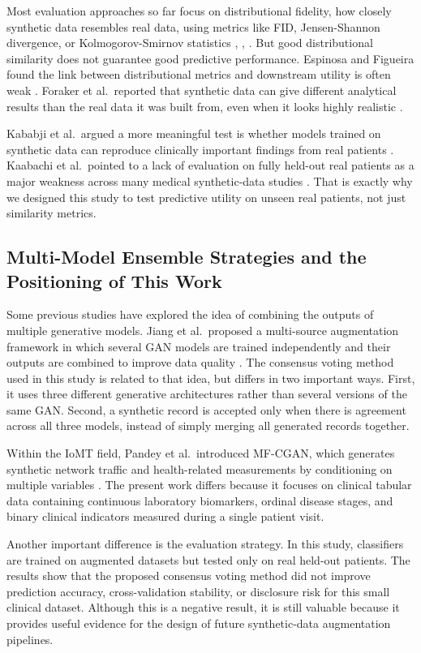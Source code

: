 \documentclass[journal]{IEEEtran}
\begin{document}
Most evaluation approaches so far focus on distributional fidelity, how closely synthetic data resembles real data, using metrics like FID, Jensen-Shannon divergence, or Kolmogorov-Smirnov statistics \cite{yan2022}, \cite{figueira2022}, \cite{dankar2022}. But good distributional similarity does not guarantee good predictive performance. Espinosa and Figueira found the link between distributional metrics and downstream utility is often weak \cite{espinosa2023}. Foraker et al.\ reported that synthetic data can give different analytical results than the real data it was built from, even when it looks highly realistic \cite{foraker2020}.

Kababji et al.\ argued a more meaningful test is whether models trained on synthetic data can reproduce clinically important findings from real patients \cite{kababji2023}. Kaabachi et al.\ pointed to a lack of evaluation on fully held-out real patients as a major weakness across many medical synthetic-data studies \cite{kaabachi2023}. That is exactly why we designed this study to test predictive utility on unseen real patients, not just similarity metrics.

\subsection{Multi-Model Ensemble Strategies and the Positioning of This Work}

Some previous studies have explored the idea of combining the outputs of multiple generative models. Jiang et al.\ proposed a multi-source augmentation framework in which several GAN models are trained independently and their outputs are combined to improve data quality \cite{jiang2023}. The consensus voting method used in this study is related to that idea, but differs in two important ways. First, it uses three different generative architectures rather than several versions of the same GAN. Second, a synthetic record is accepted only when there is agreement across all three models, instead of simply merging all generated records together.

Within the IoMT field, Pandey et al.\ introduced MF-CGAN, which generates synthetic network traffic and health-related measurements by conditioning on multiple variables \cite{pandey2025}. The present work differs because it focuses on clinical tabular data containing continuous laboratory biomarkers, ordinal disease stages, and binary clinical indicators measured during a single patient visit.

Another important difference is the evaluation strategy. In this study, classifiers are trained on augmented datasets but tested only on real held-out patients. The results show that the proposed consensus voting method did not improve prediction accuracy, cross-validation stability, or disclosure risk for this small clinical dataset. Although this is a negative result, it is still valuable because it provides useful evidence for the design of future synthetic-data augmentation pipelines.
\end{document}
